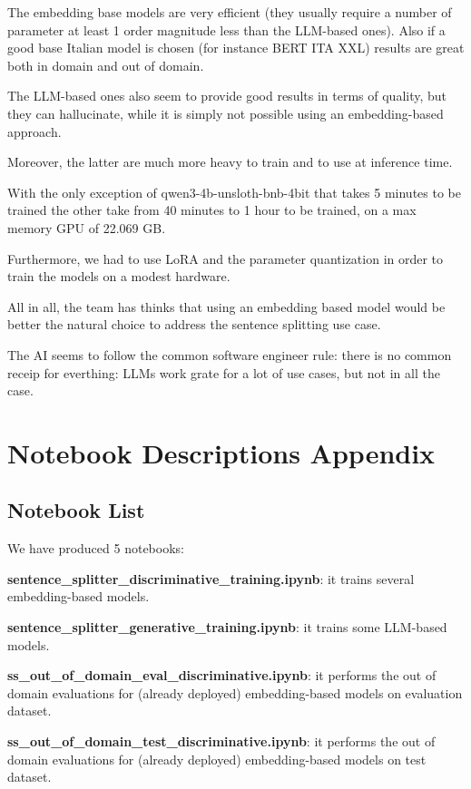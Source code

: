 \documentclass[11pt]{article}
\begin{document}
The embedding base models are very efficient (they usually require a
number of parameter at least 1 order magnitude less than the LLM-based ones).
Also if a good base Italian model is chosen (for instance BERT ITA XXL)
results are great both in domain and out of domain.

The LLM-based ones also seem to provide good results in terms of quality, but they can hallucinate, while it is simply not possible using an embedding-based approach.

Moreover, the latter are much more heavy to train and to use at inference time.

With the only exception of qwen3-4b-unsloth-bnb-4bit that takes 5 minutes
to be trained the other take from 40 minutes to 1 hour to be trained,
on a max memory GPU of 22.069 GB.

Furthermore,
we had to use LoRA and the parameter quantization in order to train the models
on a modest hardware.

All in all, the team has thinks that using an embedding based model
would be better the natural choice to address the sentence splitting use case.

The AI seems to follow the common software engineer rule:
there is no common receip for everthing:
LLMs work grate for a lot of use cases, but not in
all the case.

\appendix

\section{Notebook Descriptions Appendix}
\label{sec:appendix1}

\subsection{Notebook  List}

We have produced 5 notebooks:

\noindent \textbf{sentence\_splitter\_discriminative\_training.ipynb}: it trains several embedding-based
	models.
    
\noindent  \textbf{sentence\_splitter\_generative\_training.ipynb}: it trains some LLM-based models.

\noindent \textbf{ss\_out\_of\_domain\_eval\_discriminative.ipynb}: it performs the out of domain evaluations for (already deployed) embedding-based models on evaluation dataset.
    
\noindent \textbf{ss\_out\_of\_domain\_test\_discriminative.ipynb}: it performs the out of domain evaluations for (already deployed) embedding-based models on test dataset.
\end{document}
